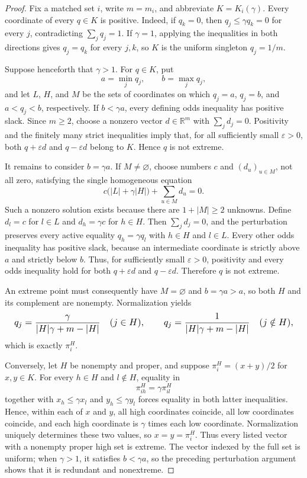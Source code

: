\documentclass{article}
\begin{document}
\begin{proof}
Fix a matched set \(i\), write \(m=m_i\), and abbreviate \(K=K_i(\gamma)\). Every coordinate of every \(q\in K\) is positive. Indeed, if \(q_k=0\), then \(q_j\le\gamma q_k=0\) for every \(j\), contradicting \(\sum_jq_j=1\). If \(\gamma=1\), applying the inequalities in both directions gives \(q_j=q_k\) for every \(j,k\), so \(K\) is the uniform singleton \(q_j=1/m\).

Suppose henceforth that \(\gamma>1\). For \(q\in K\), put
\[
a=\min_j q_j,
\qquad
b=\max_j q_j,
\]
and let \(L\), \(H\), and \(M\) be the sets of coordinates on which \(q_j=a\), \(q_j=b\), and \(a<q_j<b\), respectively. If \(b<\gamma a\), every defining odds inequality has positive slack. Since \(m\ge2\), choose a nonzero vector \(d\in\mathbb R^m\) with \(\sum_jd_j=0\). Positivity and the finitely many strict inequalities imply that, for all sufficiently small \(\varepsilon>0\), both \(q+\varepsilon d\) and \(q-\varepsilon d\) belong to \(K\). Hence \(q\) is not extreme.

It remains to consider \(b=\gamma a\). If \(M\ne\varnothing\), choose numbers \(c\) and \((d_u)_{u\in M}\), not all zero, satisfying the single homogeneous equation
\[
c\bigl(\lvert L\rvert+\gamma\lvert H\rvert\bigr)+\sum_{u\in M}d_u=0.
\]
Such a nonzero solution exists because there are \(1+\lvert M\rvert\ge2\) unknowns. Define \(d_l=c\) for \(l\in L\) and \(d_h=\gamma c\) for \(h\in H\). Then \(\sum_jd_j=0\), and the perturbation preserves every active equality \(q_h=\gamma q_l\) with \(h\in H\) and \(l\in L\). Every other odds inequality has positive slack, because an intermediate coordinate is strictly above \(a\) and strictly below \(b\). Thus, for sufficiently small \(\varepsilon>0\), positivity and every odds inequality hold for both \(q+\varepsilon d\) and \(q-\varepsilon d\). Therefore \(q\) is not extreme.

An extreme point must consequently have \(M=\varnothing\) and \(b=\gamma a>a\), so both \(H\) and its complement are nonempty. Normalization yields
\[
\makebox[\linewidth][c]{\resizebox{0.98\linewidth}{!}{\(\displaystyle q_j=\frac{\gamma}{\lvert H\rvert\gamma+m-\lvert H\rvert}
\quad (j\in H),
\qquad
q_j=\frac{1}{\lvert H\rvert\gamma+m-\lvert H\rvert}
\quad (j\notin H),\)}}
\]
which is exactly \(\pi_i^H\).

Conversely, let \(H\) be nonempty and proper, and suppose \(\pi_i^H=(x+y)/2\) for \(x,y\in K\). For every \(h\in H\) and \(l\notin H\), equality in
\[
\pi_{ih}^H=\gamma\pi_{il}^H
\]
together with \(x_h\le\gamma x_l\) and \(y_h\le\gamma y_l\) forces equality in both latter inequalities. Hence, within each of \(x\) and \(y\), all high coordinates coincide, all low coordinates coincide, and each high coordinate is \(\gamma\) times each low coordinate. Normalization uniquely determines these two values, so \(x=y=\pi_i^H\). Thus every listed vector with a nonempty proper high set is extreme. The vector indexed by the full set is uniform; when \(\gamma>1\), it satisfies \(b<\gamma a\), so the preceding perturbation argument shows that it is redundant and nonextreme.


\end{proof}
\end{document}
